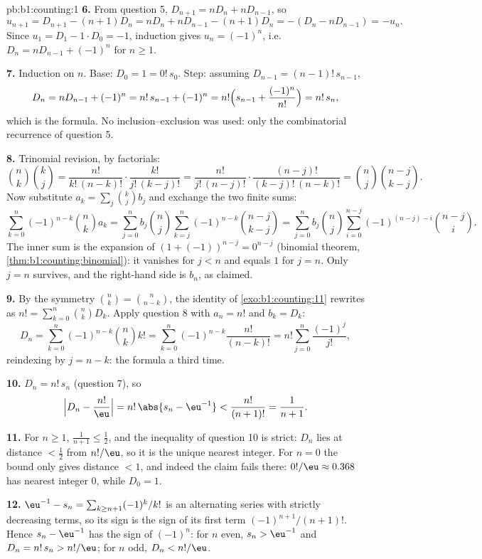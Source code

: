 \begin{solution}{pb:b1:counting:1}
\textbf{6.} From question 5, $D_{n+1} = nD_n + nD_{n-1}$, so
\[
u_{n+1} = D_{n+1} - (n+1)D_n = nD_n + nD_{n-1} - (n+1)D_n
= -(D_n - nD_{n-1}) = -u_n .
\]
Since $u_1 = D_1 - 1 \cdot D_0 = -1$, induction gives $u_n =
(-1)^n$, i.e.\ $D_n = nD_{n-1} + (-1)^n$ for $n \geq 1$.

\textbf{7.} Induction on $n$. Base: $D_0 = 1 = 0!\,s_0$. Step:
assuming $D_{n-1} = (n-1)!\,s_{n-1}$,
\[
D_n = nD_{n-1} + (-1)^n = n!\,s_{n-1} + (-1)^n
= n!\Bigl(s_{n-1} + \frac{(-1)^n}{n!}\Bigr) = n!\,s_n ,
\]
which is the formula. No inclusion--exclusion was used: only the
combinatorial recurrence of question 5.

\textbf{8.} Trinomial revision, by factorials:
\[
\binom nk \binom kj
= \frac{n!}{k!\,(n-k)!} \cdot \frac{k!}{j!\,(k-j)!}
= \frac{n!}{j!\,(n-j)!} \cdot \frac{(n-j)!}{(k-j)!\,(n-k)!}
= \binom nj \binom{n-j}{k-j} .
\]
Now substitute $a_k = \sum_j \binom kj b_j$ and exchange the two
finite sums:
\[
\sum_{k=0}^{n} (-1)^{n-k} \binom nk a_k
= \sum_{j=0}^{n} b_j \binom nj
\sum_{k=j}^{n} (-1)^{n-k} \binom{n-j}{k-j}
= \sum_{j=0}^{n} b_j \binom nj
\sum_{i=0}^{n-j} (-1)^{(n-j)-i} \binom{n-j}{i} .
\]
The inner sum is the expansion of $(1 + (-1))^{n-j} = 0^{n-j}$
(binomial theorem, \cref{thm:b1:counting:binomial}): it vanishes
for $j < n$ and equals $1$ for $j = n$. Only $j = n$ survives, and
the right-hand side is $b_n$, as claimed.

\textbf{9.} By the symmetry $\binom nk = \binom n{n-k}$, the
identity of \cref{exo:b1:counting:11} rewrites as $n! =
\sum_{k=0}^n \binom nk D_k$. Apply question 8 with $a_n = n!$ and
$b_k = D_k$:
\[
D_n = \sum_{k=0}^{n} (-1)^{n-k} \binom nk k!
= \sum_{k=0}^{n} (-1)^{n-k} \frac{n!}{(n-k)!}
= n! \sum_{j=0}^{n} \frac{(-1)^j}{j!} ,
\]
reindexing by $j = n - k$: the formula a third time.

\textbf{10.} $D_n = n!\,s_n$ (question 7), so
\[
\Bigl| D_n - \frac{n!}{\eu} \Bigr|
= n!\,\abs{s_n - \eu^{-1}} < \frac{n!}{(n+1)!} = \frac1{n+1} .
\]

\textbf{11.} For $n \geq 1$, $\frac1{n+1} \leq \frac12$, and the
inequality of question 10 is strict: $D_n$ lies at distance
$< \frac12$ from $n!/\eu$, so it is the unique nearest integer. For
$n = 0$ the bound only gives distance $< 1$, and indeed the claim
fails there: $0!/\eu \approx 0.368$ has nearest integer $0$, while
$D_0 = 1$.

\textbf{12.} $\eu^{-1} - s_n = \sum_{k \geq n+1} (-1)^k/k!$ is an
alternating series with strictly decreasing terms, so its sign is
the sign of its first term $(-1)^{n+1}/(n+1)!$. Hence $s_n -
\eu^{-1}$ has the sign of $(-1)^n$: for $n$ even, $s_n > \eu^{-1}$
and $D_n = n!\,s_n > n!/\eu$; for $n$ odd, $D_n < n!/\eu$.


\end{solution}
